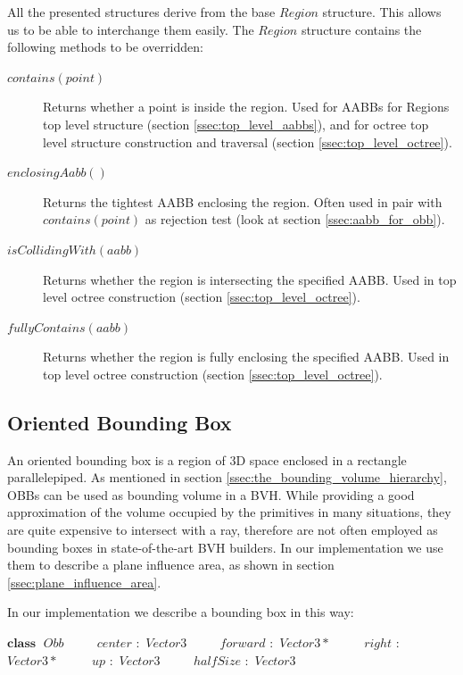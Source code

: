 \documentclass{PoliMi_MasterThesis}
\newcommand*\Class[1]{\State $\textbf{class} \;$ #1}
\newcommand*\Member[2]{\State $\qquad$ #1 $:$ #2}
\begin{document}
All the presented structures derive from the base $Region$ structure. This allows us to be able to interchange them easily. The $Region$ structure contains the following methods to be overridden:
\begin{description}
	\item[\boldmath$contains(point)$] Returns whether a point is inside the region. Used for AABBs for Regions top level structure (section \ref{ssec:top_level_aabbs}), and for octree top level structure construction and traversal (section \ref{ssec:top_level_octree}).
	\item[\boldmath$enclosingAabb()$] Returns the tightest AABB enclosing the region. Often used in pair with $contains(point)$ as rejection test (look at section \ref{ssec:aabb_for_obb}).
	\item[\boldmath$isCollidingWith(aabb)$] Returns whether the region is intersecting the specified AABB. Used in top level octree construction (section \ref{ssec:top_level_octree}).
	\item[\boldmath$fullyContains(aabb)$] Returns whether the region is fully enclosing the specified AABB. Used in top level octree construction (section \ref{ssec:top_level_octree}).
\end{description}

\subsection{Oriented Bounding Box} \label{ssec:obb}
An oriented bounding box is a region of 3D space enclosed in a rectangle parallelepiped. As mentioned in section \ref{ssec:the_bounding_volume_hierarchy}, OBBs can be used as bounding volume in a BVH. While providing a good approximation of the volume occupied by the primitives in many situations, they are quite expensive to intersect with a ray, therefore are not often employed as bounding boxes in state-of-the-art BVH builders. In our implementation we use them to describe a plane influence area, as shown in section \ref{ssec:plane_influence_area}.

In our implementation we describe a bounding box in this way:
\begin{algorithm}[H]
	\begin{algorithmic}
		\Class{$Obb$}
		\Member{$center$}{$Vector3$}
		\Member{$forward$}{$Vector3*$}
		\Member{$right$}{$Vector3*$}
		\Member{$up$}{$Vector3$}
		\Member{$halfSize$}{$Vector3$}
	\end{algorithmic}
\end{algorithm} 
\end{document}
